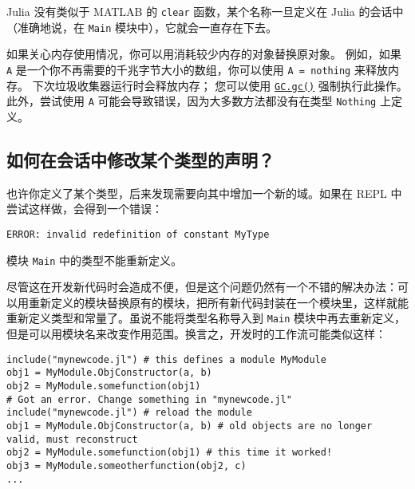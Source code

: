 Julia 没有类似于 MATLAB 的 \texttt{clear} 函数，某个名称一旦定义在 Julia 的会话中（准确地说，在 \texttt{Main} 模块中），它就会一直存在下去。



如果关心内存使用情况，你可以用消耗较少内存的对象替换原对象。 例如，如果 \texttt{A} 是一个你不再需要的千兆字节大小的数组，你可以使用 \texttt{A = nothing} 来释放内存。 下次垃圾收集器运行时会释放内存； 您可以使用 \hyperlink{16287035550645122381}{\texttt{GC.gc()}} 强制执行此操作。 此外，尝试使用 \texttt{A} 可能会导致错误，因为大多数方法都没有在类型 \texttt{Nothing} 上定义。



\hypertarget{191104846954255908}{}


\subsection{如何在会话中修改某个类型的声明？}



也许你定义了某个类型，后来发现需要向其中增加一个新的域。如果在 REPL 中尝试这样做，会得到一个错误：




\begin{lstlisting}
ERROR: invalid redefinition of constant MyType
\end{lstlisting}



模块 \texttt{Main} 中的类型不能重新定义。



尽管这在开发新代码时会造成不便，但是这个问题仍然有一个不错的解决办法：可以用重新定义的模块替换原有的模块，把所有新代码封装在一个模块里，这样就能重新定义类型和常量了。虽说不能将类型名称导入到 \texttt{Main} 模块中再去重新定义，但是可以用模块名来改变作用范围。换言之，开发时的工作流可能类似这样：




\begin{verbatim}
include("mynewcode.jl") # this defines a module MyModule
obj1 = MyModule.ObjConstructor(a, b)
obj2 = MyModule.somefunction(obj1)
# Got an error. Change something in "mynewcode.jl"
include("mynewcode.jl") # reload the module
obj1 = MyModule.ObjConstructor(a, b) # old objects are no longer valid, must reconstruct
obj2 = MyModule.somefunction(obj1) # this time it worked!
obj3 = MyModule.someotherfunction(obj2, c)
...
\end{verbatim}



\hypertarget{11224408082580741592}{}


